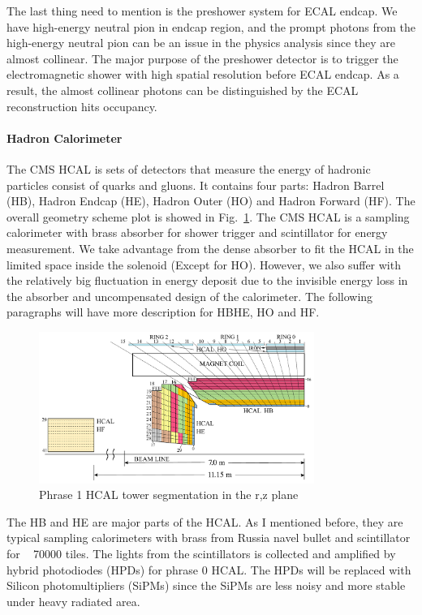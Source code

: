 The last thing need to mention is the preshower system for ECAL endcap. We have high-energy neutral pion in endcap region, and the prompt photons from the high-energy neutral pion can be an issue in the physics analysis since they are almost collinear. The major purpose of the preshower detector is to trigger the electromagnetic shower with high spatial resolution before ECAL endcap. As a result, the almost collinear photons can be distinguished by the ECAL reconstruction hits occupancy. 

\paragraph{Hadron Calorimeter}

The CMS HCAL is sets of detectors that measure the energy of hadronic particles consist of quarks and gluons. It contains four parts: Hadron Barrel (HB), Hadron Endcap (HE), Hadron Outer (HO) and Hadron Forward (HF). The overall geometry scheme plot is showed in Fig.~\ref{fig:c3cms2dhcal}. The CMS HCAL is a sampling calorimeter with brass absorber for shower trigger and scintillator for energy measurement. We take advantage from the dense absorber to fit the HCAL in the limited space inside the solenoid (Except for HO). However, we also suffer with the relatively big fluctuation in energy deposit due to the invisible energy loss in the absorber and uncompensated design of the calorimeter. The following paragraphs will have more description for HBHE, HO and HF.

\begin{figure}[htbp]
 \begin{center}
  \includegraphics[width=0.8\textwidth]{figures/c3/c3_cms_2dhcal.pdf}
 \end{center}
 \caption{Phrase 1 HCAL tower segmentation in the r,z plane}
 \label{fig:c3cms2dhcal}
\end{figure}

The HB and HE are major parts of the HCAL. As I mentioned before, they are typical sampling calorimeters with brass from Russia navel bullet and scintillator for ~ 70000 tiles. The lights from the scintillators is collected and amplified by hybrid photodiodes (HPDs) for phrase 0 HCAL. The HPDs will be replaced with Silicon photomultipliers (SiPMs) since the SiPMs are less noisy and more stable under heavy radiated area. 

